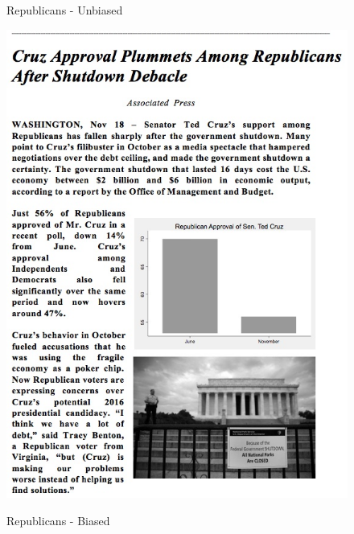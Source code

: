 \documentclass[12pt, letterpaper]{article}
\begin{document}
\begin{figure}[ht]
\centering
\begin{minipage}[b][12cm][b]{0.45\linewidth}
\caption{Republicans - Unbiased}
\includegraphics[width=1.05\textwidth]{../figs/mturk_1_treats/Rep_C.jpg}
\label{fig:minipage3}
\end{minipage}
\quad
\begin{minipage}[b]{0.45\linewidth}
\caption{Republicans - Biased}

\end{minipage}
\end{figure}
\end{document}
